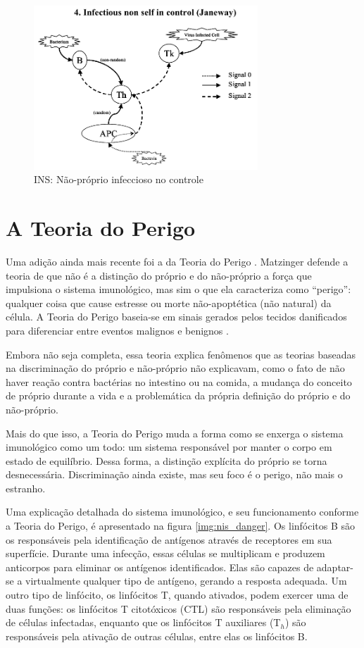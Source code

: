 \begin{figure}[h!]
\centering
\includegraphics[width=0.75\textwidth]{img/signals4-ins.png}
\caption{INS: Não-próprio infeccioso no controle \cite{Aickelin2002}}
\label{fig:nis_nsinf}
\end{figure}

\section{A Teoria do Perigo}

Uma adição ainda mais recente foi a da Teoria do Perigo \cite{Matzinger1994}. Matzinger defende a teoria de que não é a distinção do próprio e do não-próprio a força que impulsiona o sistema imunológico, mas sim o que ela caracteriza como ``perigo'': qualquer coisa que cause estresse ou morte não-apoptética (não natural) da célula. A Teoria do Perigo baseia-se em sinais gerados pelos tecidos danificados para diferenciar entre eventos malignos e benignos \cite{Cayzer2007}.

Embora não seja completa, essa teoria explica fenômenos que as teorias baseadas na discriminação do próprio e não-próprio não explicavam, como o fato de não haver reação contra bactérias no intestino ou na comida, a mudança do conceito de próprio durante a vida e a problemática da própria definição do próprio e do não-próprio.

Mais do que isso, a Teoria do Perigo muda a forma como se enxerga o sistema imunológico como um todo: um sistema responsável por manter o corpo em estado de equilíbrio. Dessa forma, a distinção explícita do próprio se torna desnecessária. Discriminação ainda existe, mas seu foco é o perigo, não mais o estranho.

Uma explicação detalhada do sistema imunológico, e seu funcionamento conforme a Teoria do Perigo, é apresentado na figura \ref{img:nis_danger}. Os linfócitos B são os responsáveis pela identificação de antígenos através de receptores em sua superfície. Durante uma infecção, essas células se multiplicam e produzem anticorpos para eliminar os antígenos identificados. Elas são capazes de adaptar-se a virtualmente qualquer tipo de antígeno, gerando a resposta adequada. Um outro tipo de linfócito, os linfócitos T, quando ativados, podem exercer uma de duas funções: os linfócitos T citotóxicos (CTL) são responsáveis pela eliminação de células infectadas, enquanto que os linfócitos T auxiliares (T$_{h}$) são responsáveis pela ativação de outras células, entre elas os linfócitos B.


